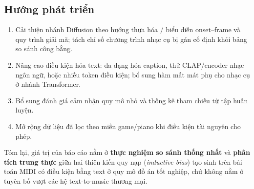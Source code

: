 \documentclass[oneside, a4paper, 12pt]{book}
\theoremstyle{plain}
\theoremstyle{definition}
\theoremstyle{remark}
\begin{document}
\subsection*{Hướng phát triển}

\begin{enumerate}
    \item Cải thiện nhánh Diffusion theo hướng thưa hóa / biểu diễn onset--frame và quy trình giải mã; tách chỉ số chương trình nhạc cụ bị gán cố định khỏi bảng so sánh công bằng.
    \item Nâng cao điều kiện hóa text: đa dạng hóa caption, thử CLAP/encoder nhạc--ngôn ngữ, hoặc nhiều token điều kiện; bổ sung hàm mất mát phụ cho nhạc cụ ở nhánh Transformer.
    \item Bổ sung đánh giá cảm nhận quy mô nhỏ và thống kê tham chiếu từ tập huấn luyện.
    \item Mở rộng dữ liệu đã lọc theo miền game/piano khi điều kiện tài nguyên cho phép.
\end{enumerate}

Tóm lại, giá trị của báo cáo nằm ở \textbf{thực nghiệm so sánh thống nhất} và \textbf{phân tích trung thực} giữa hai thiên kiến quy nạp (\textit{inductive bias}) tạo sinh trên bài toán MIDI có điều kiện bằng text ở quy mô đồ án tốt nghiệp, chứ không nằm ở tuyên bố vượt các hệ text-to-music thương mại.
\end{document}
